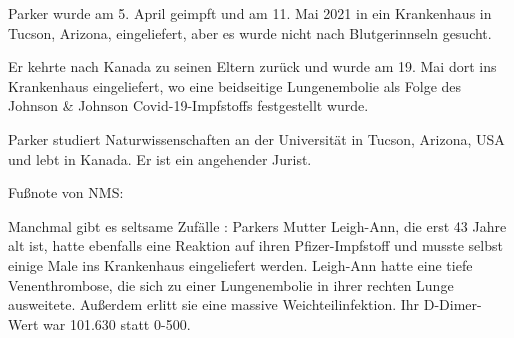 

Parker wurde am 5. April geimpft und am 11. Mai 2021 in ein Krankenhaus in Tucson, Arizona, eingeliefert, aber es wurde nicht nach Blutgerinnseln gesucht.

Er kehrte nach Kanada zu seinen Eltern zurück und wurde am 19. Mai dort ins Krankenhaus eingeliefert, wo eine beidseitige Lungenembolie als Folge des Johnson \& Johnson Covid-19-Impfstoffs festgestellt wurde.

Parker studiert Naturwissenschaften an der Universität in Tucson, Arizona, USA und lebt in Kanada. Er ist ein angehender Jurist.

Fußnote von NMS:

Manchmal gibt es seltsame Zufälle : Parkers Mutter Leigh-Ann, die erst 43 Jahre alt ist, hatte ebenfalls eine Reaktion auf ihren Pfizer-Impfstoff und musste selbst einige Male ins Krankenhaus eingeliefert werden. Leigh-Ann hatte eine tiefe Venenthrombose, die sich zu einer Lungenembolie in ihrer rechten Lunge ausweitete. Außerdem erlitt sie eine massive Weichteilinfektion. Ihr D-Dimer-Wert war 101.630 statt 0-500.
